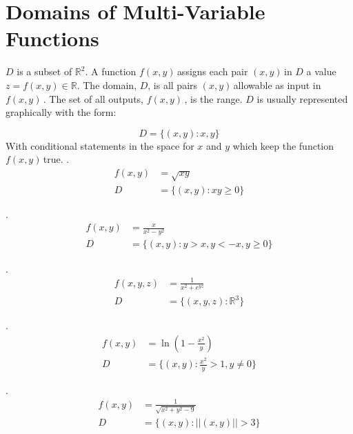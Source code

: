 \documentclass{article}
\newcommand{\n}{\leavevmode \newline} %
\newcommand{\nn}{\leavevmode \newline \newline} %
\newcommand{\R}{\mathbb{R}} %
\newcommand{\xy}{$(x,y)\,$} %
\newcommand{\fxy}{$f(x,y)\,$} %
\numberwithin{equation}{subsection} %
\begin{document}
\section{Domains of Multi-Variable Functions}
$D$ is a subset of $\R^2$. A function \fxy assigns each pair \xy in $D$ a value $z=f(x,y)\in\R$. The domain, $D$, is all pairs \xy allowable as input in \fxy. The set of all outputs, \fxy, is the range. $D$ is usually represented graphically with the form:

\begin{equation}
    D=\{(x,y): x,y\}
\end{equation}
\n
With conditional statements in the space for $x$ and $y$ which keep the function \fxy true.
\nn
{}.
\begin{equation}
    \begin{split}
        f(x,y)&=\sqrt{xy}\\
        D&=\{(x,y):xy\geq0\}
    \end{split}
\end{equation}

.
\begin{equation}
    \begin{split}
        f(x,y)&=\frac{x}{x^2-y^2}\\
        D&=\{(x,y):y>x,y<-x,y\geq0\}
    \end{split}
\end{equation}

.
\begin{equation}
    \begin{split}
        f(x,y,z)&=\frac{1}{x^2+e^{yz}}\\
        D&=\{(x,y,z):\R^3\}
    \end{split}
\end{equation}

.
\begin{equation}
    \begin{split}
        f(x,y)&=\ln(1-\frac{x^2}{y})\\
        D&=\{(x,y):\frac{x^2}{y}>1,y\neq0\}
    \end{split}
\end{equation}

.
\begin{equation}
    \begin{split}
        f(x,y)&=\frac{1}{\sqrt{x^2+y^2-9}}\\
        D&=\{(x,y):||(x,y)||>3\}
    \end{split}
\end{equation}
\end{document}
